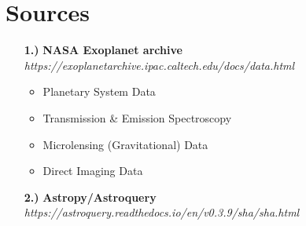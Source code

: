 \documentclass[12pt]{article}
\begin{document}
\section{Sources}

\begin{itemize}
\item[{\bf 1.)}] \textbf{ NASA Exoplanet archive} \\
\emph{https://exoplanetarchive.ipac.caltech.edu/docs/data.html}
\begin{itemize}
\item Planetary System Data
\item Transmission \& Emission Spectroscopy
\item Microlensing (Gravitational) Data
\item Direct Imaging Data
\end{itemize}
\item[{\bf 2.)}]\textbf{Astropy/Astroquery}\\
\emph{https://astroquery.readthedocs.io/en/v0.3.9/sha/sha.html}
\end{itemize}
\end{document}
